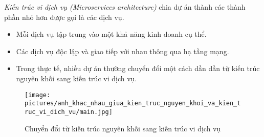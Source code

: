 \emph{Kiến trúc vi dịch vụ (Microservices architecture)} chia dự án thành các thành phần nhỏ hơn được gọi là các dịch vụ.

\begin{itemize}

    \item Mỗi dịch vụ tập trung vào một khả năng kinh doanh cụ thể.

    \item Các dịch vụ độc lập và giao tiếp với nhau thông qua hạ tầng mạng.
    \item   Trong thực tế, nhiều dự án thường chuyển đổi một cách dần dần từ kiến trúc nguyên khối sang kiến trúc vi dịch vụ.

\end{itemize}







\begin{figure}[H]


    \centering

    \texttt{[image: pictures/anh\_khac\_nhau\_giua\_kien\_truc\_nguyen\_khoi\_va\_kien\_truc\_vi\_dich\_vu/main.jpg]}

    \caption{Chuyển đổi   từ kiến trúc nguyên khối sang kiến trúc vi dịch vụ }


\end{figure}

